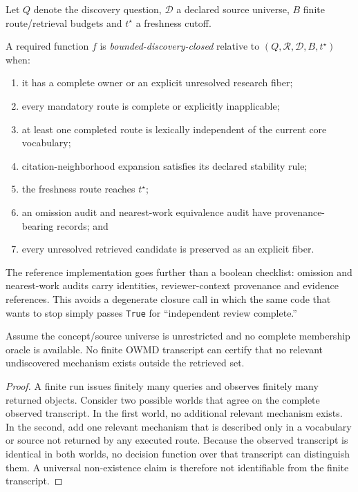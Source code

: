 Let \(Q\) denote the discovery question, \(\mathcal D\) a declared source universe, \(B\) finite route/retrieval budgets and \(t^\star\) a freshness cutoff.

\begin{definition}
A required function \(f\) is \emph{bounded-discovery-closed} relative to \((Q,\mathcal R,\mathcal D,B,t^\star)\) when:
\begin{enumerate}[leftmargin=*]
\item it has a complete owner or an explicit unresolved research fiber;
\item every mandatory route is complete or explicitly inapplicable;
\item at least one completed route is lexically independent of the current core vocabulary;
\item citation-neighborhood expansion satisfies its declared stability rule;
\item the freshness route reaches \(t^\star\);
\item an omission audit and nearest-work equivalence audit have provenance-bearing records; and
\item every unresolved retrieved candidate is preserved as an explicit fiber.
\end{enumerate}
\end{definition}

The reference implementation goes further than a boolean checklist: omission and nearest-work audits carry identities, reviewer-context provenance and evidence references. This avoids a degenerate closure call in which the same code that wants to stop simply passes \texttt{True} for ``independent review complete.''

\begin{theorem}
Assume the concept/source universe is unrestricted and no complete membership oracle is available. No finite OWMD transcript can certify that no relevant undiscovered mechanism exists outside the retrieved set.
\end{theorem}

\begin{proof}
A finite run issues finitely many queries and observes finitely many returned objects. Consider two possible worlds that agree on the complete observed transcript. In the first world, no additional relevant mechanism exists. In the second, add one relevant mechanism that is described only in a vocabulary or source not returned by any executed route. Because the observed transcript is identical in both worlds, no decision function over that transcript can distinguish them. A universal non-existence claim is therefore not identifiable from the finite transcript.
\end{proof}

